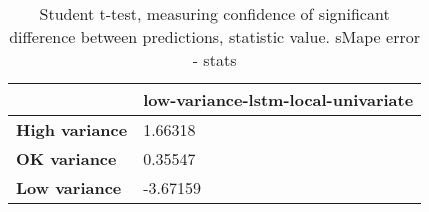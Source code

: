 \begin{table}[H]
\centering
\caption{Student t-test, measuring confidence of significant difference between predictions, statistic value. sMape error - stats}
\label{table:ttest-stats-variance-experiments-sMAPE}
\begin{tabular}{ll}
\toprule
{} & low-variance-lstm-local-univariate \\
\midrule
\textbf{High variance} &                            1.66318 \\
\textbf{OK variance  } &                            0.35547 \\
\textbf{Low variance } &                           -3.67159 \\
\bottomrule
\end{tabular}
\end{table}
